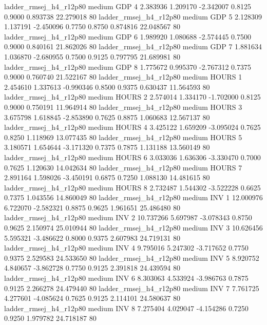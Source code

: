 ladder_rmsej_h4_r12p80     medium      GDP                 4  2.383936 1.209170 -2.342007 0.8125 0.9000  0.893738   22.279018 80
ladder_rmsej_h4_r12p80     medium      GDP                 5  2.128309 1.137191 -2.450096 0.7750 0.8750  0.874816   22.048567 80
ladder_rmsej_h4_r12p80     medium      GDP                 6  1.989920 1.080688 -2.574445 0.7500 0.9000  0.840161   21.862026 80
ladder_rmsej_h4_r12p80     medium      GDP                 7  1.881634 1.036870 -2.680955 0.7500 0.9125  0.797795   21.689981 80
ladder_rmsej_h4_r12p80     medium      GDP                 8  1.775672 0.995370 -2.767312 0.7375 0.9000  0.760740   21.522167 80
ladder_rmsej_h4_r12p80     medium    HOURS                 1  2.454610 1.337613 -0.990346 0.8500 0.9375  0.630437   11.564593 80
ladder_rmsej_h4_r12p80     medium    HOURS                 2  2.574014 1.334170 -1.702000 0.8125 0.9000  0.750191   11.964914 80
ladder_rmsej_h4_r12p80     medium    HOURS                 3  3.675798 1.618845 -2.853890 0.7625 0.8875  1.060683   12.567137 80
ladder_rmsej_h4_r12p80     medium    HOURS                 4  3.425122 1.659209 -3.095024 0.7625 0.8250  1.118969   13.077435 80
ladder_rmsej_h4_r12p80     medium    HOURS                 5  3.180571 1.654644 -3.171320 0.7375 0.7875  1.131188   13.560149 80
ladder_rmsej_h4_r12p80     medium    HOURS                 6  3.033036 1.636306 -3.330470 0.7000 0.7625  1.120630   14.042634 80
ladder_rmsej_h4_r12p80     medium    HOURS                 7  2.891164 1.598026 -3.450191 0.6875 0.7250  1.088130   14.481615 80
ladder_rmsej_h4_r12p80     medium    HOURS                 8  2.732487 1.544302 -3.522228 0.6625 0.7375  1.043556   14.860049 80
ladder_rmsej_h4_r12p80     medium      INV                 1 12.000976 6.722070 -2.582321 0.8875 0.9625  1.961651   25.486480 80
ladder_rmsej_h4_r12p80     medium      INV                 2 10.737266 5.697987 -3.078343 0.8750 0.9625  2.150974   25.010944 80
ladder_rmsej_h4_r12p80     medium      INV                 3 10.626456 5.595321 -3.486622 0.8000 0.9375  2.607983   24.719131 80
ladder_rmsej_h4_r12p80     medium      INV                 4  9.795016 5.247302 -3.717652 0.7750 0.9375  2.529583   24.533650 80
ladder_rmsej_h4_r12p80     medium      INV                 5  8.920752 4.840657 -3.862728 0.7750 0.9125  2.391818   24.439594 80
ladder_rmsej_h4_r12p80     medium      INV                 6  8.303063 4.533924 -3.986763 0.7875 0.9125  2.266278   24.479440 80
ladder_rmsej_h4_r12p80     medium      INV                 7  7.761725 4.277601 -4.085624 0.7625 0.9125  2.114101   24.580637 80
ladder_rmsej_h4_r12p80     medium      INV                 8  7.275404 4.029047 -4.154286 0.7250 0.9250  1.979782   24.718187 80
